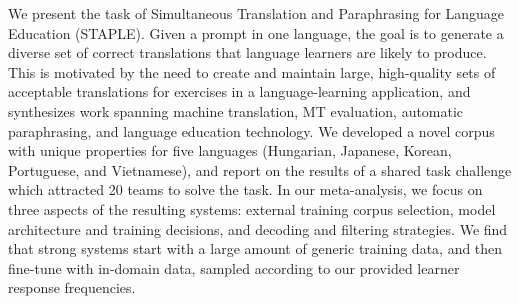 We present the task of Simultaneous Translation and Paraphrasing for Language Education (STAPLE). Given a prompt in one language, the goal is to generate a diverse set of correct translations that language learners are likely to produce. This is motivated by the need to create and maintain large, high-quality sets of acceptable translations for exercises in a language-learning application, and synthesizes work spanning machine translation, MT evaluation, automatic paraphrasing, and language education technology. We developed a novel corpus with unique properties for five languages (Hungarian, Japanese, Korean, Portuguese, and Vietnamese), and report on the results of a shared task challenge which attracted 20 teams to solve the task. In our meta-analysis, we focus on three aspects of the resulting systems: external training corpus selection, model architecture and training decisions, and decoding and filtering strategies. We find that strong systems start with a large amount of generic training data, and then fine-tune with in-domain data, sampled according to our provided learner response frequencies.
